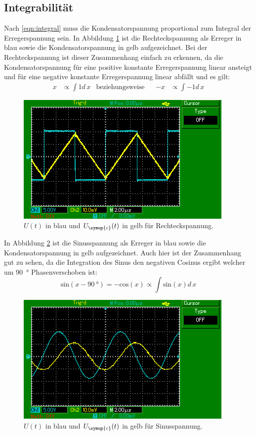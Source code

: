 \subsection{Integrabilität}
Nach \eqref{eqn:integral} muss die Kondensatorspannung proportional zum
Integral der Erregerspannung sein. In Abbildung \ref{fig:int_recht}
ist die Rechteckspannung als Erreger in blau sowie die
Kondensatorspannung in gelb aufgezeichnet. Bei der Rechteckspannung ist dieser
Zusammenhang einfach zu erkennen, da die Kondensatorspannung für eine
positive konstante Erregerspannung linear ansteigt und für eine
negative konstante Erregerspannung linear abfällt und es gilt:
\begin{align}
  x &\propto \int 1 d\, x &\text{beziehungsweise}&& -x &\propto \int -1 d\, x
\end{align}
\begin{figure}[H]
  \centering
  \includegraphics{content/images/d/rechteck.png}
  \caption{$U(t)$ in blau und $U_{\symup{c}}(t)$ in gelb für Rechteckspannung.}
  \label{fig:int_recht}
\end{figure}
In Abbildung \ref{fig:int_sin}
ist die Sinusspannung als Erreger in blau sowie die
Kondensatorspannung in gelb aufgezeichnet. Auch hier ist der Zusammenhang
gut zu sehen, da die Integration des Sinus den negativen Cosinus ergibt
welcher um \SI{90}{\degree} Phasenverschoben ist:
\begin{equation}
  \text{sin}(x-\SI{90}{\degree})=-\text{cos}(x) \propto \int \text{sin}(x)d\, x
\end{equation}
\begin{figure}[H]
  \centering
  \includegraphics{content/images/d/sinus.png}
  \caption{$U(t)$ in blau und $U_{\symup{c}}(t)$ in gelb für Sinusspannung.}
  \label{fig:int_sin}
\end{figure}
